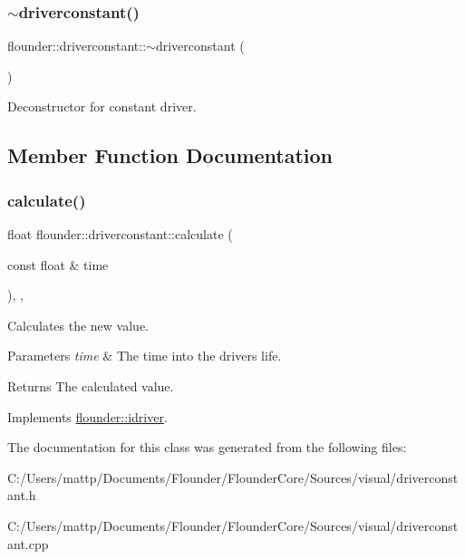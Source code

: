 \subsubsection{\texorpdfstring{$\sim$driverconstant()}{~driverconstant()}}
{\footnotesize\ttfamily flounder\+::driverconstant\+::$\sim$driverconstant (\begin{DoxyParamCaption}{ }\end{DoxyParamCaption})}



Deconstructor for constant driver. 



\subsection{Member Function Documentation}
\mbox{\label{classflounder_1_1driverconstant_acf786b61ab46ea1ebf8d9a802c33c441}} 
\subsubsection{\texorpdfstring{calculate()}{calculate()}}
{\footnotesize\ttfamily float flounder\+::driverconstant\+::calculate (\begin{DoxyParamCaption}\item[{const float \&}]{time }\end{DoxyParamCaption})\hspace{0.3cm}{\ttfamily [override]}, {\ttfamily [protected]}, {\ttfamily [virtual]}}



Calculates the new value. 


\begin{DoxyParams}{Parameters}
{\em time} & The time into the drivers life. \\
\hline
\end{DoxyParams}
\begin{DoxyReturn}{Returns}
The calculated value. 
\end{DoxyReturn}


Implements \hyperlink{classflounder_1_1idriver_a034c4159dc98c4c37ffdfaae64e4a16d}{flounder\+::idriver}.



The documentation for this class was generated from the following files\+:\begin{DoxyCompactItemize}
\item 
C\+:/\+Users/mattp/\+Documents/\+Flounder/\+Flounder\+Core/\+Sources/visual/driverconstant.\+h\item 
C\+:/\+Users/mattp/\+Documents/\+Flounder/\+Flounder\+Core/\+Sources/visual/driverconstant.\+cpp\end{DoxyCompactItemize}
